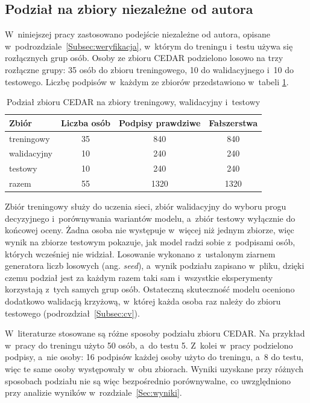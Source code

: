 \documentclass[12pt, twoside, openright]{article}
\begin{document}
\subsection{Podział na zbiory niezależne od autora}
\label{Subsec:podzial}

W~niniejszej pracy zastosowano podejście niezależne od autora, opisane w~podrozdziale~\ref{Subsec:weryfikacja}, w~którym do treningu i~testu używa się rozłącznych grup osób.
Osoby ze zbioru CEDAR podzielono losowo na trzy rozłączne grupy: 35 osób do zbioru treningowego, 10 do walidacyjnego i~10 do testowego.
Liczbę podpisów w~każdym ze zbiorów przedstawiono w~tabeli \ref{Tab:podzial}.

\begin{table}[ht]
\caption{Podział zbioru CEDAR na zbiory treningowy, walidacyjny i~testowy}
\centering
	\begin{tabular}{|l|c|c|c|}
		\hline
		Zbiór & Liczba osób & Podpisy prawdziwe & Fałszerstwa \\
		\hline
		treningowy & 35 & 840 & 840 \\
		walidacyjny & 10 & 240 & 240 \\
		testowy & 10 & 240 & 240 \\
		\hline
		razem & 55 & 1320 & 1320 \\
		\hline
	\end{tabular}
\label{Tab:podzial}
\end{table}

Zbiór treningowy służy do uczenia sieci, zbiór walidacyjny do wyboru progu decyzyjnego i~porównywania wariantów modelu, a~zbiór testowy wyłącznie do końcowej oceny.
Żadna osoba nie występuje w~więcej niż jednym zbiorze, więc wynik na zbiorze testowym pokazuje, jak model radzi sobie z~podpisami osób, których wcześniej nie widział.
Losowanie wykonano z~ustalonym ziarnem generatora liczb losowych (ang. \textit{seed}), a~wynik podziału zapisano w~pliku, dzięki czemu podział jest za każdym razem taki sam i~wszystkie eksperymenty korzystają z~tych samych grup osób.
Ostateczną skuteczność modelu oceniono dodatkowo walidacją krzyżową, w~której każda osoba raz należy do zbioru testowego (podrozdział~\ref{Subsec:cv}).

W~literaturze stosowane są różne sposoby podziału zbioru CEDAR.
Na przykład w~pracy \cite{dey2017} do treningu użyto 50 osób, a~do testu 5.
Z~kolei w~pracy \cite{kalera2004} podzielono podpisy, a~nie osoby: 16 podpisów każdej osoby użyto do treningu, a~8 do testu, więc te same osoby występowały w~obu zbiorach.
Wyniki uzyskane przy różnych sposobach podziału nie są więc bezpośrednio porównywalne, co uwzględniono przy analizie wyników w~rozdziale~\ref{Sec:wyniki}.
\end{document}
